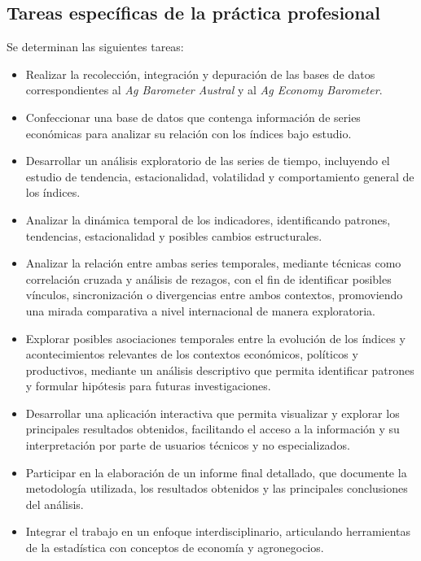 \documentclass[12pt]{article}
\providecommand{\tightlist}{%
  \setlength{\itemsep}{0pt}\setlength{\parskip}{0pt}}\usepackage{longtable,booktabs,array}
\begin{document}
\subsection{Tareas específicas de la práctica
profesional}\label{tareas-especuxedficas-de-la-pruxe1ctica-profesional}

Se determinan las siguientes tareas:

\begin{itemize}
\tightlist
\item
  Realizar la recolección, integración y depuración de las bases de
  datos correspondientes al \emph{Ag Barometer Austral} y al \emph{Ag
  Economy Barometer}.
\item
  Confeccionar una base de datos que contenga información de series
  económicas para analizar su relación con los índices bajo estudio.
\item
  Desarrollar un análisis exploratorio de las series de tiempo,
  incluyendo el estudio de tendencia, estacionalidad, volatilidad y
  comportamiento general de los índices.
\item
  Analizar la dinámica temporal de los indicadores, identificando
  patrones, tendencias, estacionalidad y posibles cambios estructurales.
\item
  Analizar la relación entre ambas series temporales, mediante técnicas
  como correlación cruzada y análisis de rezagos, con el fin de
  identificar posibles vínculos, sincronización o divergencias entre
  ambos contextos, promoviendo una mirada comparativa a nivel
  internacional de manera exploratoria.
\item
  Explorar posibles asociaciones temporales entre la evolución de los
  índices y acontecimientos relevantes de los contextos económicos,
  políticos y productivos, mediante un análisis descriptivo que permita
  identificar patrones y formular hipótesis para futuras
  investigaciones.
\item
  Desarrollar una aplicación interactiva que permita visualizar y
  explorar los principales resultados obtenidos, facilitando el acceso a
  la información y su interpretación por parte de usuarios técnicos y no
  especializados.
\item
  Participar en la elaboración de un informe final detallado, que
  documente la metodología utilizada, los resultados obtenidos y las
  principales conclusiones del análisis.
\item
  Integrar el trabajo en un enfoque interdisciplinario, articulando
  herramientas de la estadística con conceptos de economía y
  agronegocios.
\end{itemize}
\end{document}
